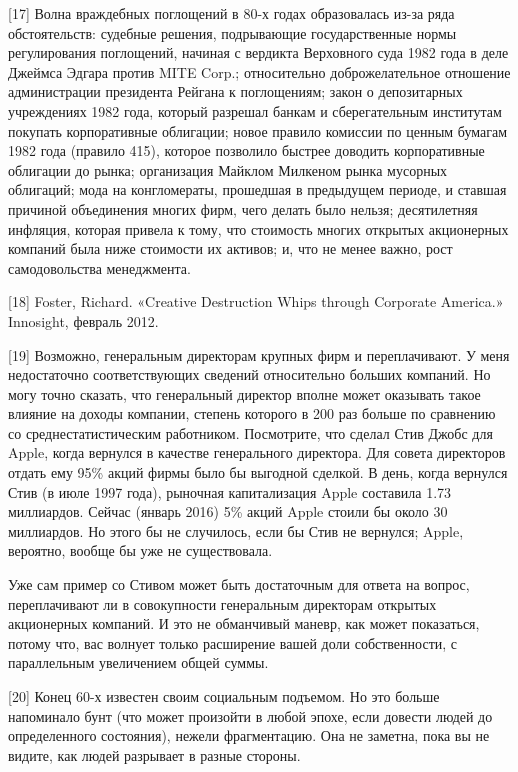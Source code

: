 \documentclass[ebook,12pt,oneside,openany]{memoir}
\begin{document}
[17] Волна враждебных поглощений в 80-х годах образовалась из-за ряда
обстоятельств: судебные решения, подрывающие государственные нормы
регулирования поглощений, начиная с вердикта Верховного суда 1982 года
в деле Джеймса Эдгара против MITE Corp.; относительно доброжелательное
отношение администрации президента Рейгана к поглощениям; закон о
депозитарных учреждениях 1982 года, который разрешал банкам и
сберегательным институтам покупать корпоративные облигации; новое
правило комиссии по ценным бумагам 1982 года (правило 415), которое
позволило быстрее доводить корпоративные облигации до рынка;
организация Майклом Милкеном рынка мусорных облигаций; мода на
конгломераты, прошедшая в предыдущем периоде, и ставшая причиной
объединения многих фирм, чего делать было нельзя; десятилетняя
инфляция, которая привела к тому, что стоимость многих открытых
акционерных компаний была ниже стоимости их активов; и, что не менее
важно, рост самодовольства менеджмента. \newline

[18] Foster, Richard. «Creative Destruction Whips through Corporate
America.» Innosight, февраль 2012. \newline

[19] Возможно, генеральным директорам крупных фирм и переплачивают. У
меня недостаточно соответствующих сведений относительно больших
компаний. Но могу точно сказать, что генеральный директор вполне может
оказывать такое влияние на доходы компании, степень которого в 200 раз
больше по сравнению со среднестатистическим работником. Посмотрите,
что сделал Стив Джобс для Apple, когда вернулся в качестве
генерального директора. Для совета директоров отдать ему 95\% акций
фирмы было бы выгодной сделкой. В день, когда вернулся Стив (в июле
1997 года), рыночная капитализация Apple составила 1.73 миллиардов.
Сейчас (январь 2016) 5\% акций Apple стоили бы около 30 миллиардов. Но
этого бы не случилось, если бы Стив не вернулся; Apple, вероятно,
вообще бы уже не существовала. \newline

Уже сам пример со Стивом может быть достаточным для ответа на вопрос,
переплачивают ли в совокупности генеральным директорам открытых
акционерных компаний. И это не обманчивый маневр, как может
показаться, потому что, вас волнует только расширение вашей доли
собственности, с параллельным увеличением общей суммы. \newline

[20] Конец 60-х известен своим социальным подъемом. Но это больше
напоминало бунт (что может произойти в любой эпохе, если довести людей
до определенного состояния), нежели фрагментацию. Она не заметна, пока
вы не видите, как людей разрывает в разные стороны. \newline
\end{document}
